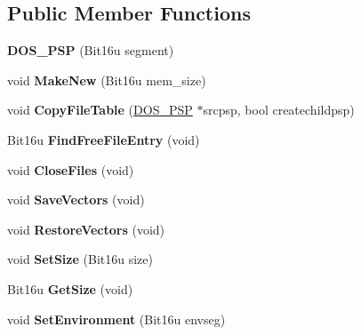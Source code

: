 \subsection*{Public Member Functions}
\begin{DoxyCompactItemize}
\item 
\hypertarget{classDOS__PSP_a63819aa4ad95757c911450add9c3e8d2}{{\bfseries D\-O\-S\-\_\-\-P\-S\-P} (Bit16u segment)}\label{classDOS__PSP_a63819aa4ad95757c911450add9c3e8d2}

\item 
\hypertarget{classDOS__PSP_affa0051f928a7722d8a3ed9428956125}{void {\bfseries Make\-New} (Bit16u mem\-\_\-size)}\label{classDOS__PSP_affa0051f928a7722d8a3ed9428956125}

\item 
\hypertarget{classDOS__PSP_ac9d915b8669d8ff2320f9f1761295c96}{void {\bfseries Copy\-File\-Table} (\hyperlink{classDOS__PSP}{D\-O\-S\-\_\-\-P\-S\-P} $\ast$srcpsp, bool createchildpsp)}\label{classDOS__PSP_ac9d915b8669d8ff2320f9f1761295c96}

\item 
\hypertarget{classDOS__PSP_afdeb504910e039b3c8d11e06d4ec5ff4}{Bit16u {\bfseries Find\-Free\-File\-Entry} (void)}\label{classDOS__PSP_afdeb504910e039b3c8d11e06d4ec5ff4}

\item 
\hypertarget{classDOS__PSP_af12c39db39710c714734d676a66bea39}{void {\bfseries Close\-Files} (void)}\label{classDOS__PSP_af12c39db39710c714734d676a66bea39}

\item 
\hypertarget{classDOS__PSP_ad5ed56e031815fb7881224c61fa0051f}{void {\bfseries Save\-Vectors} (void)}\label{classDOS__PSP_ad5ed56e031815fb7881224c61fa0051f}

\item 
\hypertarget{classDOS__PSP_afa00392a13950a65d3faaab37ff281b0}{void {\bfseries Restore\-Vectors} (void)}\label{classDOS__PSP_afa00392a13950a65d3faaab37ff281b0}

\item 
\hypertarget{classDOS__PSP_a43b18fe590a04ea160810c76d7009aba}{void {\bfseries Set\-Size} (Bit16u size)}\label{classDOS__PSP_a43b18fe590a04ea160810c76d7009aba}

\item 
\hypertarget{classDOS__PSP_ac8cb727be4728d84161af8b4ede8eea0}{Bit16u {\bfseries Get\-Size} (void)}\label{classDOS__PSP_ac8cb727be4728d84161af8b4ede8eea0}

\item 
\hypertarget{classDOS__PSP_a9d0530a763b3497f915e9e716f782fd0}{void {\bfseries Set\-Environment} (Bit16u envseg)}\label{classDOS__PSP_a9d0530a763b3497f915e9e716f782fd0}


\end{DoxyCompactItemize}
